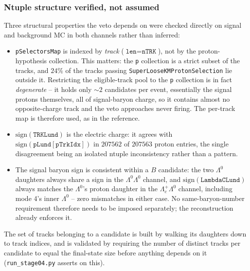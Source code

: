 \subsubsection{Ntuple structure verified, not assumed}

Three structural properties the veto depends on were checked directly on
signal and background MC in both channels rather than inferred:

\begin{itemize}
  \item \texttt{pSelectorsMap} is indexed by \emph{track}
    ($\texttt{len} = \texttt{nTRK}$), not by the proton-hypothesis
    collection. This matters: the \texttt{p} collection is a strict subset
    of the tracks, and $24\%$ of the tracks passing
    \texttt{SuperLooseKMProtonSelection} lie outside it. Restricting the
    eligible-track pool to the \texttt{p} collection is in fact
    \emph{degenerate} -- it holds only ${\sim}2$ candidates per event,
    essentially the signal protons themselves, all of signal-baryon charge,
    so it contains almost no opposite-charge track and the veto approaches
    never firing. The per-track map is therefore used, as in the reference.
  \item $\mathrm{sign}(\texttt{TRKLund})$ is the electric charge: it agrees
    with $\mathrm{sign}(\texttt{pLund}[\texttt{pTrkIdx}])$ in $207562$ of
    $207563$ proton entries, the single disagreement being an isolated
    ntuple inconsistency rather than a pattern.
  \item The signal baryon sign is consistent within a $B$ candidate: the two
    $\Lambda^0$ daughters always share a sign in the $\Lambda^0\Lambda^0$
    channel, and $\mathrm{sign}(\texttt{LambdaCLund})$ always matches the
    $\Lambda^0$'s proton daughter in the $\Lambda_c^+\Lambda^0$ channel,
    including mode 4's inner $\Lambda^0$ -- zero mismatches in either case.
    No same-baryon-number requirement therefore needs to be imposed
    separately; the reconstruction already enforces it.
\end{itemize}

The set of tracks belonging to a candidate is built by walking its daughters
down to track indices, and is validated by requiring the number of distinct
tracks per candidate to equal the final-state size before anything depends
on it (\texttt{run\_stage04.py} asserts on this).

